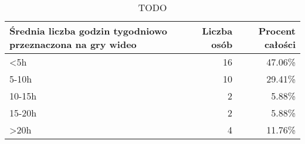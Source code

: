 \begin{table}[h!]
    \begin{center}
        \begin{tabular}{|m{15em}|r|r|}
            \hline
            Średnia liczba godzin tygodniowo przeznaczona na gry wideo & Liczba osób & Procent całości \\
            \hline
            <5h & 16 & 47.06\% \\
            5-10h & 10 & 29.41\% \\
            10-15h & 2 & 5.88\% \\
            15-20h & 2 & 5.88\% \\
            >20h & 4 & 11.76\% \\
            \hline
        \end{tabular}
    \end{center}
    \caption{TODO}\label{tab1:ch7_5}
\end{table}


